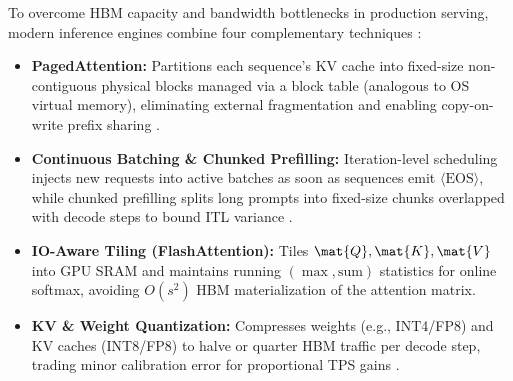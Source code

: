 \documentclass[../../../../master.tex]{subfiles}
\begin{document}
To overcome HBM capacity and bandwidth bottlenecks in production serving, modern inference engines combine four complementary techniques :
\begin{itemize}
  \item \textbf{PagedAttention:} Partitions each sequence's KV cache into fixed-size non-contiguous physical blocks managed via a block table (analogous to OS virtual memory), eliminating external fragmentation and enabling copy-on-write prefix sharing .
  \item \textbf{Continuous Batching \& Chunked Prefilling:} Iteration-level scheduling injects new requests into active batches as soon as sequences emit $\langle\mathrm{EOS}\rangle$, while chunked prefilling splits long prompts into fixed-size chunks overlapped with decode steps to bound ITL variance .
  \item \textbf{IO-Aware Tiling (FlashAttention):} Tiles $\mat{Q}, \mat{K}, \mat{V}$ into GPU SRAM and maintains running $(\max, \text{sum})$ statistics for online softmax, avoiding $O(s^2)$ HBM materialization of the attention matrix.
  \item \textbf{KV \& Weight Quantization:} Compresses weights (e.g., INT4/FP8) and KV caches (INT8/FP8) to halve or quarter HBM traffic per decode step, trading minor calibration error for proportional TPS gains .
\end{itemize}
\end{document}
